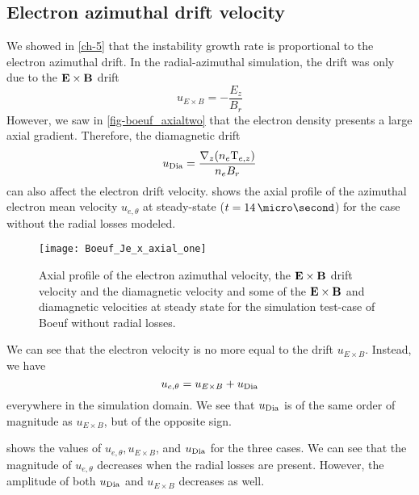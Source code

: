 
  \subsection{Electron azimuthal drift velocity} \label{subsec-drift}

  We showed in \cref{ch-5} that the instability growth rate is proportional to the electron azimuthal drift.
  In the radial-azimuthal simulation, the drift was only due to the ${\mathbf E} \times {\mathbf B}$ drift
  \begin{equation} \label{eq-exbdrift}
    u_{E \times B} = - \frac{E_z}{B_r}
  \end{equation}
  However, we saw in \cref{fig-boeuf_axialtwo} that the electron density presents a large axial gradient.
  Therefore, the diamagnetic drift
  $$u_{\rm Dia}=\frac{\nabla_z (n_e {\rm T}_{e,z})}{n_e B_r}$$
  can also affect the electron drift velocity.
   shows the axial profile of the azimuthal electron mean velocity $u_{e, \theta}$ at steady-state ($t = 14\,\micro\second$) for the case without the radial losses modeled.

 
  \begin{figure}[hbt]
    \centering
    \texttt{[image: Boeuf\_Je\_x\_axial\_one]}
    \caption{Axial profile of the electron azimuthal velocity, the ${\mathbf E} \times {\mathbf B}$ drift velocity and the diamagnetic velocity and some of the ${\mathbf E} \times {\mathbf B}$ and diamagnetic velocities at steady state for the simulation test-case of Boeuf without radial losses.}
    \label{fig-Jetheta_sum}
  \end{figure}
  
  We can see that the electron velocity is no more equal to the drift $u_{E \times B}$.
  Instead, we have 
  $$ u_{e, \theta} =   u_{E \times B} + u_{\rm Dia}$$
  everywhere in the simulation domain.
  We see that $u_{\rm Dia}$ is of the same order of magnitude as $u_{E \times B}$, but of the opposite sign.

   shows the values of $ u_{e, \theta},   u_{E \times B}$, and $u_{\rm Dia}$ for the three cases.
  We can see that the magnitude of $u_{e, \theta} $ decreases when the radial losses are present.
  However, the amplitude of both $u_{\rm Dia}$ and $u_{E \times B}$ decreases as well.

